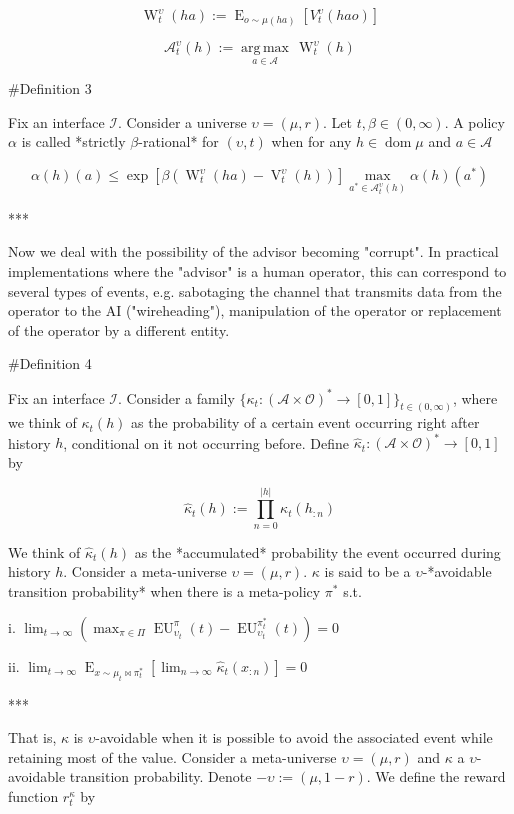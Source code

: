 \documentclass[a4paper]{article}
\DeclareMathOperator{\Dom}{dom}
\newcommand{\E}{\operatorname{E}}
\newcommand{\Argmax}[1]{\underset{#1}{\operatorname{arg\,max}}\,}
\newcommand{\Abs}[1]{\lvert #1 \rvert}
\newcommand{\Ob}{\mathcal{O}}
\newcommand{\A}{\mathcal{A}}
\newcommand{\I}{\mathcal{I}}
\newcommand{\FH}{(\A \times \Ob)^*}
\newcommand{\V}{\operatorname{V}}
\newcommand{\W}{\operatorname{W}}
\newcommand{\EU}{\operatorname{EU}}
\begin{document}
$$\W_t^\upsilon(ha):=\E_{o \sim \mu(ha)}[V_t^\upsilon(hao)]$$

$$\A^\upsilon_t(h) := \Argmax{a \in \A} \W_t^\upsilon(h)$$

\#Definition 3

Fix an interface $\I$. Consider a universe $\upsilon=(\mu,r)$. Let $t,\beta \in (0,\infty)$. A policy $\alpha$ is called *strictly $\beta$-rational* for $(\upsilon,t)$ when for any $h \in \Dom{\mu}$ and $a \in \A$

$$\alpha(h)(a) \leq \exp{[\beta(\W^{\upsilon}_t(ha)-\V^\upsilon_t(h))]} \max_{a^* \in \A^\upsilon_t(h)} \alpha(h)(a^*)$$

***

Now we deal with the possibility of the advisor becoming "corrupt". In practical implementations where the "advisor" is a human operator, this can correspond to several types of events, e.g. sabotaging the channel that transmits data from the operator to the AI ("wireheading"), manipulation of the operator or replacement of the operator by a different entity.

\#Definition 4

Fix an interface $\I$. Consider a family $\{\kappa_t: \FH \rightarrow [0,1]\}_{t \in (0,\infty)}$, where we think of $\kappa_t(h)$ as the probability of a certain event occurring right after history $h$, conditional on it not occurring before. Define $\hat{\kappa}_t: \FH \rightarrow [0,1]$ by

$$\hat{\kappa}_t(h):= \prod_{n = 0}^{\Abs{h}} \kappa_t(h_{:n})$$

We think of $\hat{\kappa}_t(h)$ as the *accumulated* probability the event occurred during history $h$. Consider a meta-universe $\upsilon=(\mu,r)$. $\kappa$ is said to be a $\upsilon$-*avoidable transition probability* when there is a meta-policy $\pi^*$ s.t.

i. $\lim_{t \rightarrow \infty} {(\max_{\pi \in \Pi} \EU_{\upsilon_t}^{\pi}(t)-\EU_{\upsilon_t}^{\pi^*_t}(t))} = 0$

ii. $\lim_{t \rightarrow \infty} \E_{x \sim \mu_t\bowtie\pi^*_t}[\lim_{n \rightarrow \infty} \hat{\kappa}_t(x_{:n})] = 0$

***

That is, $\kappa$ is $\upsilon$-avoidable when it is possible to avoid the associated event while retaining most of the value. Consider a meta-universe $\upsilon=(\mu,r)$ and $\kappa$ a $\upsilon$-avoidable transition probability. Denote $-\upsilon:=(\mu,1-r)$. We define the reward function $r^\kappa_t$ by
\end{document}
